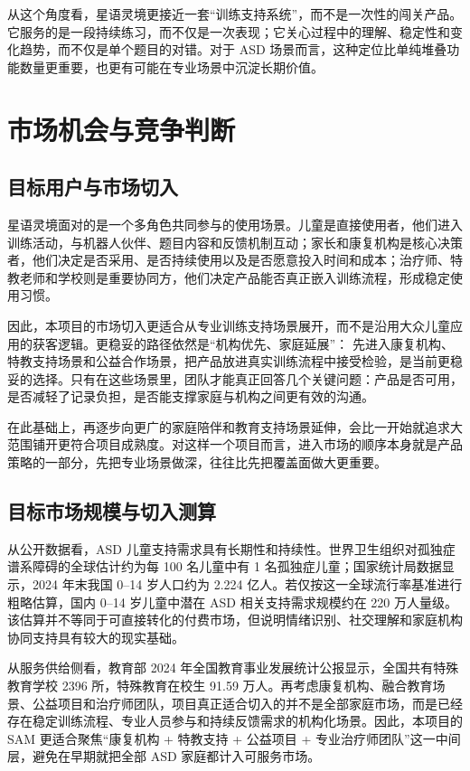 从这个角度看，星语灵境更接近一套“训练支持系统”，而不是一次性的闯关产品。它服务的是一段持续练习，而不仅是一次表现；它关心过程中的理解、稳定性和变化趋势，而不仅是单个题目的对错。对于 ASD 场景而言，这种定位比单纯堆叠功能数量更重要，也更有可能在专业场景中沉淀长期价值。

\chapter{市场机会与竞争判断}

\section{目标用户与市场切入}
星语灵境面对的是一个多角色共同参与的使用场景。儿童是直接使用者，他们进入训练活动，与机器人伙伴、题目内容和反馈机制互动；家长和康复机构是核心决策者，他们决定是否采用、是否持续使用以及是否愿意投入时间和成本；治疗师、特教老师和学校则是重要协同方，他们决定产品能否真正嵌入训练流程，形成稳定使用习惯。

因此，本项目的市场切入更适合从专业训练支持场景展开，而不是沿用大众儿童应用的获客逻辑。更稳妥的路径依然是“机构优先、家庭延展”：
先进入康复机构、特教支持场景和公益合作场景，把产品放进真实训练流程中接受检验，是当前更稳妥的选择。只有在这些场景里，团队才能真正回答几个关键问题：产品是否可用，是否减轻了记录负担，是否能支撑家庭与机构之间更有效的沟通。

在此基础上，再逐步向更广的家庭陪伴和教育支持场景延伸，会比一开始就追求大范围铺开更符合项目成熟度。对这样一个项目而言，进入市场的顺序本身就是产品策略的一部分，先把专业场景做深，往往比先把覆盖面做大更重要。

\section{目标市场规模与切入测算}
从公开数据看，ASD 儿童支持需求具有长期性和持续性。世界卫生组织对孤独症谱系障碍的全球估计约为每 100 名儿童中有 1 名孤独症儿童；国家统计局数据显示，2024 年末我国 0--14 岁人口约为 2.224 亿人。若仅按这一全球流行率基准进行粗略估算，国内 0--14 岁儿童中潜在 ASD 相关支持需求规模约在 220 万人量级。该估算并不等同于可直接转化的付费市场，但说明情绪识别、社交理解和家庭机构协同支持具有较大的现实基础。

从服务供给侧看，教育部 2024 年全国教育事业发展统计公报显示，全国共有特殊教育学校 2396 所，特殊教育在校生 91.59 万人。再考虑康复机构、融合教育场景、公益项目和治疗师团队，项目真正适合切入的并不是全部家庭市场，而是已经存在稳定训练流程、专业人员参与和持续反馈需求的机构化场景。因此，本项目的 SAM 更适合聚焦“康复机构 + 特教支持 + 公益项目 + 专业治疗师团队”这一中间层，避免在早期就把全部 ASD 家庭都计入可服务市场。


